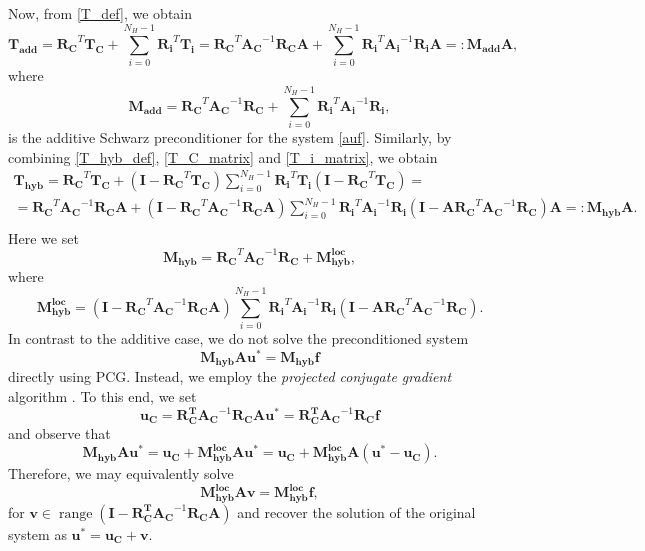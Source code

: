 \documentclass[11pt]{article}
\theoremstyle{definition}
\theoremstyle{theorem}
\begin{document}
Now, from \eqref{T_def}, we obtain
\[
\bm{T_{add}} = \bm{R_C}^T \bm{T_C} + \sum_{i=0}^{N_H-1}\bm{R_i}^T\bm{T_i} =
  \bm{R_C}^T\bm{A_C}^{-1}\bm{R_C}\bm{A}
  + \sum_{i=0}^{N_H-1} \bm{R_i}^T\bm{A_i}^{-1}\bm{R_i}\bm{A}=:\bm{M_{add}}\bm{A},
\]
where
\begin{equation}
  \bm{M_{add}} = \bm{R_C}^T \bm{A_C}^{-1} \bm{R_C} + \sum_{i=0}^{N_H-1} \bm{R_i}^T \bm{A_i}^{-1} \bm{R_i},\label{M_matrix}
\end{equation}
is the additive Schwarz preconditioner for the system \eqref{auf}. Similarly,
by combining \eqref{T_hyb_def}, \eqref{T_C_matrix} and \eqref{T_i_matrix}, we obtain
\begin{multline*}
  \bm{T_{hyb}}= \bm{R_C}^T \bm{T_C} + \left(\bm{I} - \bm{R_C}^T \bm{T_C}\right)
  \sum_{i=0}^{N_H-1} \bm{R_i}^T \bm{T_i} \left(\bm{I} - \bm{R_C}^T \bm{T_C}\right)=\\
  = \bm{R_C}^T \bm{A_C}^{-1} \bm{R_C} \bm{A} +
  \left(\bm{I} - \bm{R_C}^T \bm{A_C}^{-1} \bm{R_C} \bm{A}\right)
  \sum_{i=0}^{N_H-1} \bm{R_i}^T \bm{A_i}^{-1} \bm{R_i}
  \left(\bm{I} - \bm{A}\bm{R_C}^T \bm{A_C}^{-1} \bm{R_C}\right)\bm{A}=: \bm{M_{hyb}}\bm{A}.\\
\end{multline*}
Here we set
\[
  \bm{M_{hyb}} = \bm{R_C}^T \bm{A_C}^{-1} \bm{R_C} + \bm{M_{hyb}^{loc}},
\]
where
\begin{equation}
  \bm{M_{hyb}^{loc}} =
  \left(\bm{I} - \bm{R_C}^T \bm{A_C}^{-1} \bm{R_C} \bm{A}\right)
  \sum_{i=0}^{N_H-1} \bm{R_i}^T \bm{A_i}^{-1} \bm{R_i}
  \left(\bm{I} - \bm{A}\bm{R_C}^T \bm{A_C}^{-1} \bm{R_C}\right).
  \label{M_hyb_loc}
\end{equation}
In contrast to the additive case, we do not solve the preconditioned system
\[
  \bm{M_{hyb}} \bm{A} \bm{u^*} = \bm{M_{hyb}} \bm{f}
\]
directly using PCG. Instead, we employ the \emph{projected conjugate gradient} algorithm
\cite{toselli}. To this end, we set
\[
  \bm{u_C} = \bm{R_C^T}\bm{A_C}^{-1}\bm{R_C}\bm{A} \bm{u^*}= \bm{R_C^T} \bm{A_C}^{-1} \bm{R_C} \bm{f}
\]
and observe that
\[
  \bm{M_{hyb}} \bm{A} \bm{u^*} = \bm{u_C} + \bm{M_{hyb}^{loc}} \bm{A} \bm{u^*}=
  \bm{u_C} + \bm{M_{hyb}^{loc}} \bm{A} \left(\bm{u^*} - \bm{u_C}\right).
\]
Therefore, we may equivalently solve
\begin{equation}
  \bm{M_{hyb}^{loc}} \bm{A} \bm{v} =
  \bm{M_{hyb}^{loc}} \bm{f}, \label{projected_system}
\end{equation}
for $\bm{v}\in \operatorname{range}(\bm{I} - \bm{R_C^T} \bm{A_C}^{-1} \bm{R_C} \bm{A})$
and recover the solution of the original system as $\bm{u^*} = \bm{u_C} + \bm{v}$.
\end{document}
